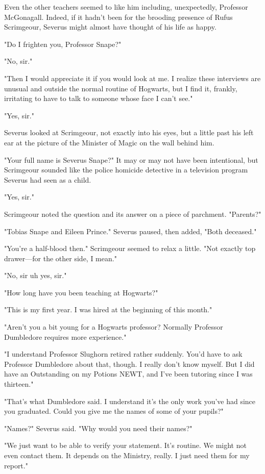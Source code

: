 Even the other teachers seemed to like him including, unexpectedly, Professor McGonagall. Indeed, if it hadn't been for the brooding presence of Rufus Scrimgeour, Severus might almost have thought of his life as happy.

"Do I frighten you, Professor Snape?"

"No, sir."

"Then I would appreciate it if you would look at me. I realize these interviews are unusual and outside the normal routine of Hogwarts, but I find it, frankly, irritating to have to talk to someone whose face I can't see."

"Yes, sir."

Severus looked at Scrimgeour, not exactly into his eyes, but a little past his left ear at the picture of the Minister of Magic on the wall behind him.

"Your full name is Severus Snape?" It may or may not have been intentional, but Scrimgeour sounded like the police homicide detective in a television program Severus had seen as a child.

"Yes, sir."

Scrimgeour noted the question and its answer on a piece of parchment. "Parents?"

"Tobias Snape and Eileen Prince." Severus paused, then added, "Both deceased."

"You're a half-blood then." Scrimgeour seemed to relax a little. "Not exactly top drawer—for the other side, I mean."

"No, sir{\el} uh{\el} yes, sir."

"How long have you been teaching at Hogwarts?"

"This is my first year. I was hired at the beginning of this month."

"Aren't you a bit young for a Hogwarts professor? Normally Professor Dumbledore requires more experience."

"I understand Professor Slughorn retired rather suddenly. You'd have to ask Professor Dumbledore about that, though. I really don't know myself. But I did have an Outstanding on my Potions NEWT, and I've been tutoring since I was thirteen."

"That's what Dumbledore said. I understand it's the only work you've had since you graduated. Could you give me the names of some of your pupils?"

"Names?" Severus said. "Why would you need their names?"

"We just want to be able to verify your statement. It's routine. We might not even contact them. It depends on the Ministry, really. I just need them for my report."

